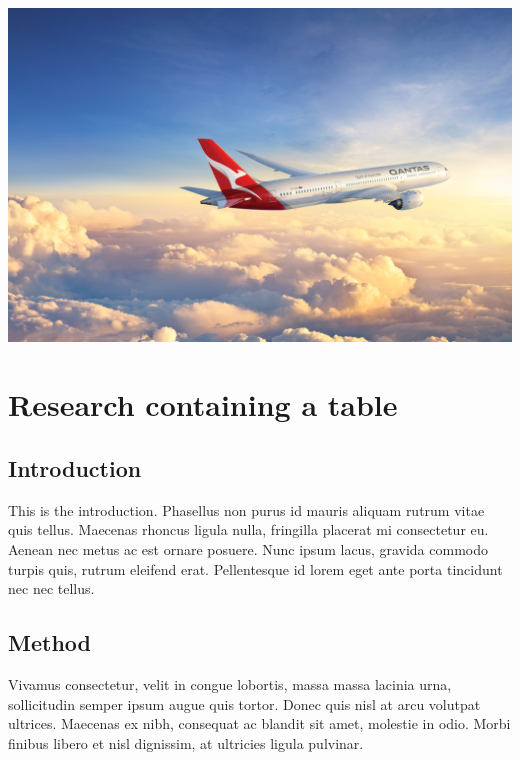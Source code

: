 \documentclass[12pt,a4paper,]{report}
\let\origfigure=\figure
\let\endorigfigure=\endfigure
\renewenvironment{figure}[1][]{%
\origfigure[b]
}{%
\endorigfigure
}
\begin{document}
\begin{figure}
\hypertarget{fig:other_fig}{%
\centering
\includegraphics[width=1\textwidth,height=\textheight]{source/figures/full_caption_example.jpg}
\caption{This is not a boat}\label{fig:other_fig}
}
\end{figure}

\hypertarget{research-containing-a-table}{%
\chapter{Research containing a
table}\label{research-containing-a-table}}

\hypertarget{introduction-3}{%
\section{Introduction}\label{introduction-3}}

This is the introduction. Phasellus non purus id mauris aliquam rutrum
vitae quis tellus. Maecenas rhoncus ligula nulla, fringilla placerat mi
consectetur eu. Aenean nec metus ac est ornare posuere. Nunc ipsum
lacus, gravida commodo turpis quis, rutrum eleifend erat. Pellentesque
id lorem eget ante porta tincidunt nec nec tellus.

\hypertarget{method-2}{%
\section{Method}\label{method-2}}

Vivamus consectetur, velit in congue lobortis, massa massa lacinia urna,
sollicitudin semper ipsum augue quis tortor. Donec quis nisl at arcu
volutpat ultrices. Maecenas ex nibh, consequat ac blandit sit amet,
molestie in odio. Morbi finibus libero et nisl dignissim, at ultricies
ligula pulvinar.
\end{document}
